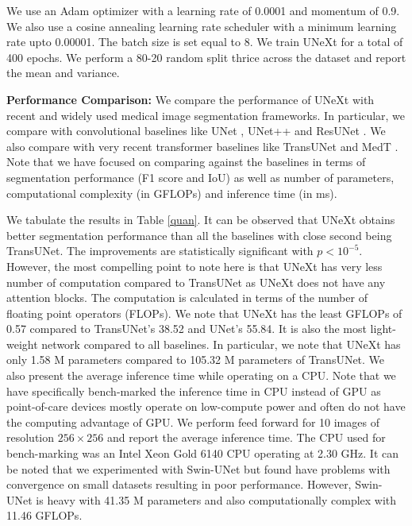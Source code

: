 \documentclass[runningheads]{llncs}
\begin{document}
We use an Adam optimizer with a learning rate of 0.0001 and momentum of 0.9. We also use a cosine annealing learning rate scheduler with a minimum learning rate upto 0.00001. The batch size is set equal to 8. We train UNeXt for a total of 400 epochs. We perform a 80-20 random split thrice across the dataset and report the mean and variance.

\noindent \textbf{Performance Comparison:} We compare the performance of UNeXt with recent and widely used medical image segmentation frameworks. In particular, we compare with convolutional baselines like UNet \cite{ronneberger2015u}, UNet++ \cite{zhou2018unet++} and ResUNet \cite{zhang2018road}. We also compare with very recent transformer baselines like TransUNet \cite{chen2021transunet} and MedT \cite{jose2021medical}. Note that we have focused on comparing against the baselines in terms of segmentation performance (F1 score and IoU) as well as number of parameters, computational complexity (in GFLOPs) and inference time (in ms). 

We tabulate the results in Table \ref{quan}. It can be observed that UNeXt obtains better segmentation performance than all the  baselines with close second being TransUNet. The  improvements are statistically significant with $p < 10^{-5}$. However, the most compelling point to note here is that UNeXt has very less number of computation compared to TransUNet as UNeXt does not have any attention blocks. The computation is calculated in terms of the number of floating point operators (FLOPs). We note that UNeXt has the least GFLOPs of 0.57 compared to TransUNet's 38.52 and UNet's 55.84.  It is also the most light-weight network compared to all baselines. In particular, we note that UNeXt has only 1.58 M parameters compared to 105.32 M parameters of TransUNet. We also present the average inference time while operating on a CPU. Note that we have specifically bench-marked the inference time in CPU instead of GPU as point-of-care devices mostly operate on low-compute power and often do not have the computing advantage of GPU.  We perform feed forward for 10 images of resolution $256 \times 256$ and report the average inference time. The CPU used for bench-marking was an Intel Xeon Gold 6140 CPU operating at 2.30 GHz. It can be noted that we experimented with Swin-UNet \cite{cao2021swin} but found have problems with convergence on small datasets resulting in poor performance. However, Swin-UNet is heavy with 41.35 M parameters and also computationally complex with 11.46 GFLOPs.  
\end{document}
